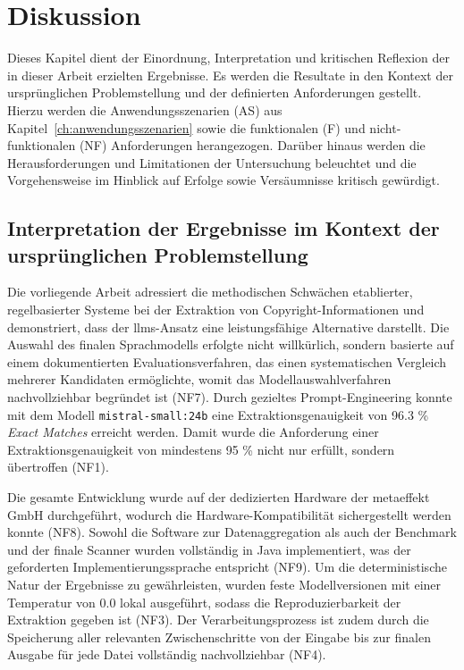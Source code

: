 \chapter{Diskussion}\label{ch:diskussion}

Dieses Kapitel dient der Einordnung, Interpretation und kritischen Reflexion der in dieser Arbeit erzielten Ergebnisse.
Es werden die Resultate in den Kontext der ursprünglichen Problemstellung und der definierten Anforderungen gestellt.
Hierzu werden die Anwendungsszenarien (AS) aus Kapitel~\ref{ch:anwendungsszenarien} sowie die funktionalen (F) und nicht-funktionalen (NF) Anforderungen herangezogen.
Darüber hinaus werden die Herausforderungen und Limitationen der Untersuchung beleuchtet und die Vorgehensweise im Hinblick auf Erfolge sowie Versäumnisse kritisch gewürdigt.


\section{Interpretation der Ergebnisse im Kontext der ursprünglichen Problemstellung}

Die vorliegende Arbeit adressiert die methodischen Schwächen etablierter, regelbasierter Systeme bei der Extraktion von Copyright-Informationen und demonstriert, dass der \glspl{llm}-Ansatz eine leistungsfähige Alternative darstellt.
Die Auswahl des finalen Sprachmodells erfolgte nicht willkürlich, sondern basierte auf einem dokumentierten Evaluationsverfahren, das einen systematischen Vergleich mehrerer Kandidaten ermöglichte, womit das Modellauswahlverfahren nachvollziehbar begründet ist (NF7).
Durch gezieltes Prompt-Engineering konnte mit dem Modell \texttt{mistral-small:24b} eine Extraktionsgenauigkeit von \num{96,3} \% \textit{Exact Matches} erreicht werden.
Damit wurde die Anforderung einer Extraktionsgenauigkeit von mindestens \num{95} \% nicht nur erfüllt, sondern übertroffen (NF1).

Die gesamte Entwicklung wurde auf der dedizierten Hardware der metaeffekt GmbH durchgeführt, wodurch die Hardware-Kompatibilität sichergestellt werden konnte (NF8).
Sowohl die Software zur Datenaggregation als auch der Benchmark und der finale Scanner wurden vollständig in Java implementiert, was der geforderten Implementierungssprache entspricht (NF9).
Um die deterministische Natur der Ergebnisse zu gewährleisten, wurden feste Modellversionen mit einer Temperatur von \num{0.0} lokal ausgeführt, sodass die Reproduzierbarkeit der Extraktion gegeben ist (NF3).
Der Verarbeitungsprozess ist zudem durch die Speicherung aller relevanten Zwischenschritte von der Eingabe bis zur finalen Ausgabe für jede Datei vollständig nachvollziehbar (NF4).


